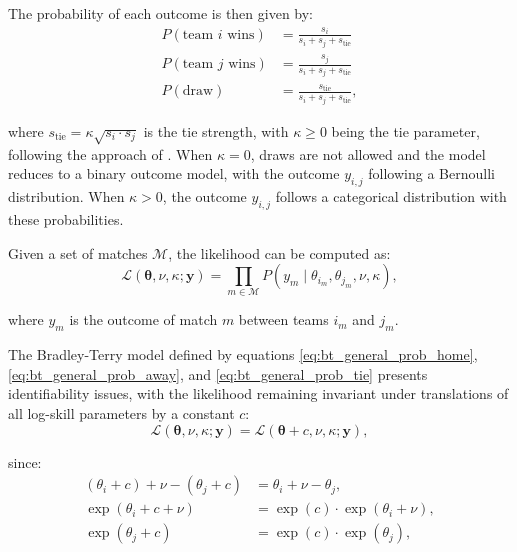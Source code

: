 The probability of each outcome is then given by:
\begin{align}
    \label{eq:bt_general_prob_home}
    P(\text{team } i \text{ wins}) &= \frac{s_i}{s_i + s_j + s_{\text{tie}}} \\
    \label{eq:bt_general_prob_away}
    P(\text{team } j \text{ wins}) &= \frac{s_j}{s_i + s_j + s_{\text{tie}}} \\
    \label{eq:bt_general_prob_tie}
    P(\text{draw}) &= \frac{s_{\text{tie}}}{s_i + s_j + s_{\text{tie}}},
\end{align}

\noindent where $s_{\text{tie}} = \kappa \sqrt{s_i \cdot s_j}$ is the tie strength, with $\kappa \geq 0$ being the tie parameter, following the approach of \textcite{davidson_1970}.
When $\kappa = 0$, draws are not allowed and the model reduces to a binary outcome model, with the outcome $y_{i,j}$ following a Bernoulli distribution.
When $\kappa > 0$, the outcome $y_{i,j}$ follows a categorical distribution with these probabilities.

Given a set of matches $\mathcal{M}$, the likelihood can be computed as:
\begin{equation}
    \label{eq:bt_general_likelihood}
    \mathcal{L}(\boldsymbol{\theta}, \nu, \kappa ; \mathbf{y}) = \prod_{m \in \mathcal{M}} P(y_m \mid \theta_{i_m}, \theta_{j_m}, \nu, \kappa),
\end{equation}

\noindent where $y_m$ is the outcome of match $m$ between teams $i_m$ and $j_m$.

The Bradley-Terry model defined by equations \ref{eq:bt_general_prob_home}, \ref{eq:bt_general_prob_away}, and \ref{eq:bt_general_prob_tie} presents identifiability issues, with the likelihood remaining invariant under translations of all log-skill parameters by a constant $c$:
\begin{equation}
    \mathcal{L}(\boldsymbol{\theta}, \nu, \kappa ; \mathbf{y}) = \mathcal{L}(\boldsymbol{\theta} + c, \nu, \kappa ;\mathbf{y}),
\end{equation}

\noindent since:
\begin{align*}
    (\theta_i + c) + \nu - (\theta_j + c) &= \theta_i + \nu - \theta_j, \\
    \exp(\theta_i + c + \nu) &= \exp(c) \cdot \exp(\theta_i + \nu), \\
    \exp(\theta_j + c) &= \exp(c) \cdot \exp(\theta_j),
\end{align*}

